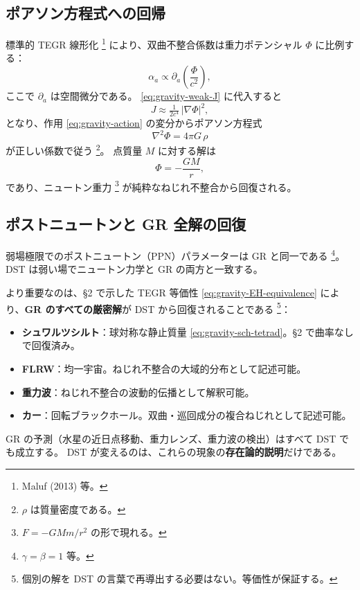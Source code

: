 \documentclass[dvipdfmx,a4paper,oneside]{jsbook}
\numberwithin{equation}{chapter}
\begin{document}
\subsection{ポアソン方程式への回帰}

標準的 TEGR 線形化 \footnote{Maluf (2013) 等。} により、双曲不整合係数は重力ポテンシャル \(\Phi\) に比例する：
\begin{equation}
  \alpha_a \propto \partial_a\!\left(\frac{\Phi}{c^2}\right),
  \label{eq:gravity-alpha-Phi}
\end{equation}
ここで \(\partial_a\) は空間微分である。
\eqref{eq:gravity-weak-J} に代入すると
\begin{equation}
  J \approx \tfrac{1}{2c^4}\, |\nabla\Phi|^2,
  \label{eq:gravity-weak-J-Phi}
\end{equation}
となり、作用 \eqref{eq:gravity-action} の変分からポアソン方程式
\begin{equation}
  \nabla^2 \Phi = 4\pi G\, \rho
  \label{eq:gravity-poisson}
\end{equation}
が正しい係数で従う \footnote{\(\rho\) は質量密度である。}。
点質量 \(M\) に対する解は
\begin{equation}
  \Phi = -\frac{GM}{r},
  \label{eq:gravity-newton-potential}
\end{equation}
であり、ニュートン重力 \footnote{\(F = -GMm/r^2\) の形で現れる。} が純粋なねじれ不整合から回復される。

\subsection{ポストニュートンと GR 全解の回復}

弱場極限でのポストニュートン（PPN）パラメーターは GR と同一である \footnote{\(\gamma = \beta = 1\) 等。}。DST は弱い場でニュートン力学と GR の両方と一致する。

より重要なのは、§2 で示した TEGR 等価性 \eqref{eq:gravity-EH-equivalence} により、\textbf{GR のすべての厳密解}が DST から回復されることである \footnote{個別の解を DST の言葉で再導出する必要はない。等価性が保証する。}：
\begin{itemize}[leftmargin=2em]
  \item \textbf{シュワルツシルト}：球対称な静止質量 \eqref{eq:gravity-sch-tetrad}。§2 で曲率なしで回復済み。
  \item \textbf{FLRW}：均一宇宙。ねじれ不整合の大域的分布として記述可能。
  \item \textbf{重力波}：ねじれ不整合の波動的伝播として解釈可能。
  \item \textbf{カー}：回転ブラックホール。双曲・巡回成分の複合ねじれとして記述可能。
\end{itemize}
GR の予測（水星の近日点移動、重力レンズ、重力波の検出）はすべて DST でも成立する。
DST が変えるのは、これらの現象の\textbf{存在論的説明}だけである。
\end{document}
